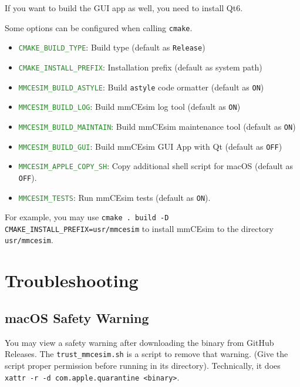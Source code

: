 If you want to build the GUI app as well, you need to install Qt6.
\newline

Some options can be configured when calling \texttt{cmake}.
\begin{itemize}
  \item \textcolor{forestgreen}{\texttt{CMAKE\_BUILD\_TYPE}}: Build type (default as \texttt{Release})
  \item \textcolor{forestgreen}{\texttt{CMAKE\_INSTALL\_PREFIX}}: Installation prefix (default as system path)
  \item \textcolor{forestgreen}{\texttt{MMCESIM\_BUILD\_ASTYLE}}: Build \texttt{astyle} code ormatter (default as \texttt{ON})
  \item \textcolor{forestgreen}{\texttt{MMCESIM\_BUILD\_LOG}}: Build mmCEsim log tool (default as \texttt{ON})
  \item \textcolor{forestgreen}{\texttt{MMCESIM\_BUILD\_MAINTAIN}}: Build mmCEsim maintenance tool (default as \texttt{ON})
  \item \textcolor{forestgreen}{\texttt{MMCESIM\_BUILD\_GUI}}: Build mmCEsim GUI App with Qt (default as \texttt{OFF})
  \item \textcolor{forestgreen}{\texttt{MMCESIM\_APPLE\_COPY\_SH}}: Copy additional shell script for macOS (default as \texttt{OFF}).
  \item \textcolor{forestgreen}{\texttt{MMCESIM\_TESTS}}: Run mmCEsim tests (default as \texttt{ON}).
\end{itemize}

For example, you may use \lstinline[morekeywords={cmake}]{cmake . build -D CMAKE_INSTALL_PREFIX=usr/mmcesim}
to install mmCEsim to the directory \texttt{usr/mmcesim}.

\section{Troubleshooting}
\subsection{macOS Safety Warning}
You may view a safety warning after downloading the binary from GitHub Releases.
The \texttt{trust\_mmcesim.sh} is a script to remove that warning.
(Give the script proper permission before running in its directory).
Technically, it does \lstinline[morekeywords={xattr}]{xattr -r -d com.apple.quarantine <binary>}.

